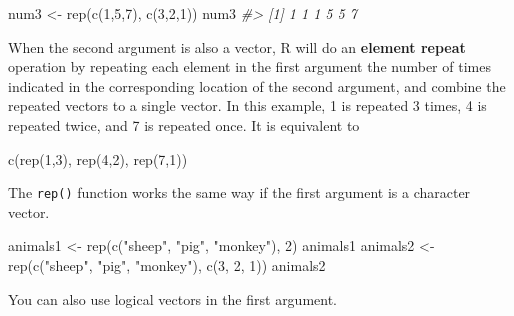 \documentclass[
]{book}
\newenvironment{Shaded}{\begin{snugshade}}{\end{snugshade}}
\newcommand{\CommentTok}[1]{\textcolor[rgb]{0.56,0.35,0.01}{\textit{#1}}}
\newcommand{\DecValTok}[1]{\textcolor[rgb]{0.00,0.00,0.81}{#1}}
\newcommand{\FunctionTok}[1]{\textcolor[rgb]{0.00,0.00,0.00}{#1}}
\newcommand{\NormalTok}[1]{#1}
\newcommand{\OtherTok}[1]{\textcolor[rgb]{0.56,0.35,0.01}{#1}}
\newcommand{\StringTok}[1]{\textcolor[rgb]{0.31,0.60,0.02}{#1}}
\begin{document}
\begin{Shaded}
\begin{Highlighting}[]
\NormalTok{num3 }\OtherTok{\textless{}{-}} \FunctionTok{rep}\NormalTok{(}\FunctionTok{c}\NormalTok{(}\DecValTok{1}\NormalTok{,}\DecValTok{5}\NormalTok{,}\DecValTok{7}\NormalTok{), }\FunctionTok{c}\NormalTok{(}\DecValTok{3}\NormalTok{,}\DecValTok{2}\NormalTok{,}\DecValTok{1}\NormalTok{))}
\NormalTok{num3}
\CommentTok{\#\textgreater{} [1] 1 1 1 5 5 7}
\end{Highlighting}
\end{Shaded}

When the second argument is also a vector, R will do an \textbf{element repeat} operation by repeating each element in the first argument the number of times indicated in the corresponding location of the second argument, and combine the repeated vectors to a single vector. In this example, 1 is repeated 3 times, 4 is repeated twice, and 7 is repeated once. It is equivalent to

\begin{Shaded}
\begin{Highlighting}[]
\FunctionTok{c}\NormalTok{(}\FunctionTok{rep}\NormalTok{(}\DecValTok{1}\NormalTok{,}\DecValTok{3}\NormalTok{), }\FunctionTok{rep}\NormalTok{(}\DecValTok{4}\NormalTok{,}\DecValTok{2}\NormalTok{), }\FunctionTok{rep}\NormalTok{(}\DecValTok{7}\NormalTok{,}\DecValTok{1}\NormalTok{))}
\end{Highlighting}
\end{Shaded}

The \texttt{rep()} function works the same way if the first argument is a character vector.

\begin{Shaded}
\begin{Highlighting}[]
\NormalTok{animals1 }\OtherTok{\textless{}{-}} \FunctionTok{rep}\NormalTok{(}\FunctionTok{c}\NormalTok{(}\StringTok{"sheep"}\NormalTok{, }\StringTok{"pig"}\NormalTok{, }\StringTok{"monkey"}\NormalTok{), }\DecValTok{2}\NormalTok{)}
\NormalTok{animals1}
\NormalTok{animals2 }\OtherTok{\textless{}{-}} \FunctionTok{rep}\NormalTok{(}\FunctionTok{c}\NormalTok{(}\StringTok{"sheep"}\NormalTok{, }\StringTok{"pig"}\NormalTok{, }\StringTok{"monkey"}\NormalTok{), }\FunctionTok{c}\NormalTok{(}\DecValTok{3}\NormalTok{, }\DecValTok{2}\NormalTok{, }\DecValTok{1}\NormalTok{))}
\NormalTok{animals2}
\end{Highlighting}
\end{Shaded}

You can also use logical vectors in the first argument.
\end{document}
